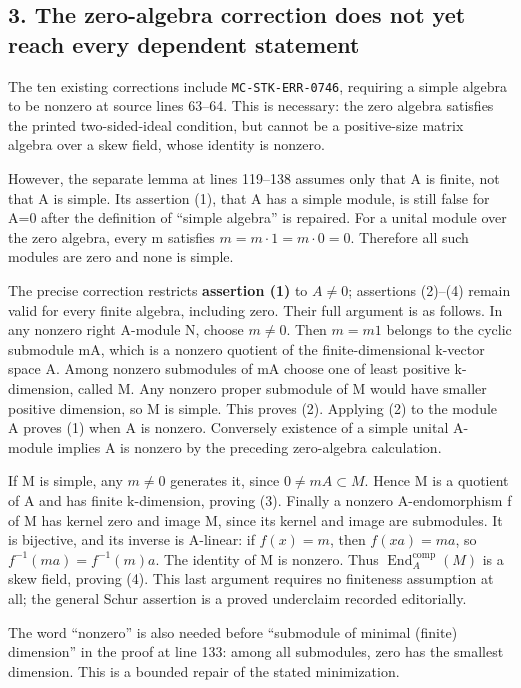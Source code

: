 \documentclass[11pt]{article}
\begin{document}
\subsection{3. The zero-algebra correction does not yet reach every dependent statement}\label{the-zero-algebra-correction-does-not-yet-reach-every-dependent-statement}

The ten existing corrections include \texttt{MC-STK-ERR-0746}, requiring a simple algebra to be nonzero at source lines 63--64. This is necessary: the zero algebra satisfies the printed two-sided-ideal condition, but cannot be a positive-size matrix algebra over a skew field, whose identity is nonzero.

However, the separate lemma at lines 119--138 assumes only that A is finite, not that A is simple. Its assertion (1), that A has a simple module, is still false for A=0 after the definition of ``simple algebra'' is repaired. For a unital module over the zero algebra, every m satisfies \(m=m\cdot 1=m\cdot 0=0\). Therefore all such modules are zero and none is simple.

The precise correction restricts \textbf{assertion (1)} to \(A\ne 0\); assertions (2)--(4) remain valid for every finite algebra, including zero. Their full argument is as follows. In any nonzero right A-module N, choose \(m\ne 0\). Then \(m=m1\) belongs to the cyclic submodule mA, which is a nonzero quotient of the finite-dimensional k-vector space A. Among nonzero submodules of mA choose one of least positive k-dimension, called M. Any nonzero proper submodule of M would have smaller positive dimension, so M is simple. This proves (2). Applying (2) to the module A proves (1) when A is nonzero. Conversely existence of a simple unital A-module implies A is nonzero by the preceding zero-algebra calculation.

If M is simple, any \(m\ne 0\) generates it, since \(0\ne mA\subset M\). Hence M is a quotient of A and has finite k-dimension, proving (3). Finally a nonzero A-endomorphism f of M has kernel zero and image M, since its kernel and image are submodules. It is bijective, and its inverse is A-linear: if \(f(x)=m\), then \(f(xa)=ma\), so \(f^{-1}(ma)=f^{-1}(m)a\). The identity of M is nonzero. Thus \(\operatorname{End}_{A}^{\mathrm{comp}}(M)\) is a skew field, proving (4). This last argument requires no finiteness assumption at all; the general Schur assertion is a proved underclaim recorded editorially.

The word ``nonzero'' is also needed before ``submodule of minimal (finite) dimension'' in the proof at line 133: among all submodules, zero has the smallest dimension. This is a bounded repair of the stated minimization.
\end{document}
